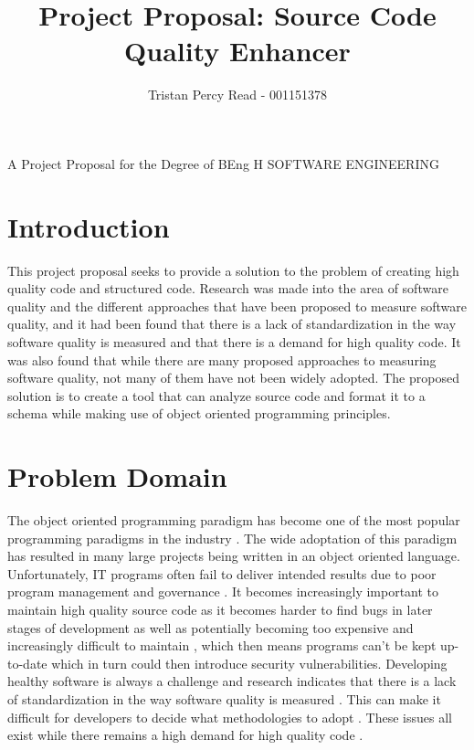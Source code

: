 \documentclass{article} %
\begin{document}

\title{Project Proposal: Source Code Quality Enhancer} %
\author{Tristan Percy Read - 001151378} %

\maketitle %
{
	\centering
	A Project Proposal for the Degree of BEng H SOFTWARE ENGINEERING

} %

\section{Introduction} %
This project proposal seeks to provide a solution to the problem of creating high quality code and structured code. Research was made into the area of software quality and the different approaches that have been proposed to measure software quality, and it had been found that there is a lack of standardization in the way software quality is measured and that there is a demand for high quality code. It was also found that while there are many proposed approaches to measuring software quality, not many of them have not been widely adopted. The proposed solution is to create a tool that can analyze source code and format it to a schema while making use of object oriented programming principles.

\section{Problem Domain}

The object oriented programming paradigm has become one of the most popular programming paradigms in the industry \citep{6606742}. The wide adoptation of this paradigm has resulted in many large projects being written in an object oriented language.
Unfortunately, IT programs often fail to deliver intended results due to poor program management and governance \citep{7372958}. It becomes increasingly important to maintain high quality source code as it becomes harder to find bugs in later stages of development \citep{8681007} as well as potentially becoming too expensive and increasingly difficult to maintain \citep{8802820, 10.1145/2507288.2507312, 10.1145/3379597.3387457, 6606742, 7372958}, which then means programs can't be kept up-to-date which in turn could then introduce security vulnerabilities.
Developing healthy software is always a challenge \citep{8681007} and research indicates that there is a lack of standardization in the way software quality is measured \citep{6606742, 8681007}. This can make it difficult for developers to decide what methodologies to adopt \citep{6606742}. These issues all exist while there remains a high demand for high quality code \citep{6606742}.
\end{document}

